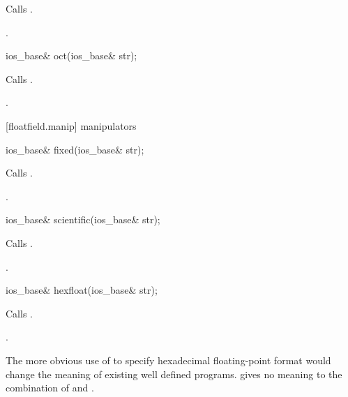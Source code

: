 \begin{itemdescr}
\pnum
\effects
Calls
.

\pnum
\returns
{}.
\end{itemdescr}

%
\begin{itemdecl}
ios_base& oct(ios_base& str);
\end{itemdecl}

\begin{itemdescr}
\pnum
\effects
Calls
.

\pnum
\returns
{}.
\end{itemdescr}

[floatfield.manip]{ manipulators}

%
\begin{itemdecl}
ios_base& fixed(ios_base& str);
\end{itemdecl}

\begin{itemdescr}
\pnum
\effects
Calls
.

\pnum
\returns
{}.
\end{itemdescr}

%
\begin{itemdecl}
ios_base& scientific(ios_base& str);
\end{itemdecl}

\begin{itemdescr}
\pnum
\effects
Calls
.

\pnum
\returns
{}.
\end{itemdescr}

%
\begin{itemdecl}
ios_base& hexfloat(ios_base& str);
\end{itemdecl}

\begin{itemdescr}
\pnum\effects Calls .

\pnum\returns {}.
\end{itemdescr}

\pnum
\begin{note} The more obvious use of
 to specify hexadecimal floating-point format would
change the meaning of existing well defined programs. \CppIII
gives no meaning to the combination of  and
.\end{note}


